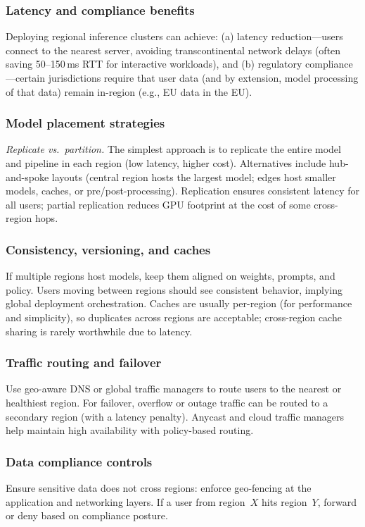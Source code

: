 \subsubsection{Latency and compliance benefits}
Deploying regional inference clusters can achieve: (a) latency reduction---users connect to the nearest server, avoiding transcontinental network delays (often saving 50--150\,ms RTT for interactive workloads), and (b) regulatory compliance---certain jurisdictions require that user data (and by extension, model processing of that data) remain in-region (e.g., EU data in the EU).

\subsubsection{Model placement strategies}
\emph{Replicate vs.\ partition.} The simplest approach is to replicate the entire model and pipeline in each region (low latency, higher cost). Alternatives include hub-and-spoke layouts (central region hosts the largest model; edges host smaller models, caches, or pre/post-processing). Replication ensures consistent latency for all users; partial replication reduces GPU footprint at the cost of some cross-region hops.

\subsubsection{Consistency, versioning, and caches}
If multiple regions host models, keep them aligned on weights, prompts, and policy. Users moving between regions should see consistent behavior, implying global deployment orchestration. Caches are usually per-region (for performance and simplicity), so duplicates across regions are acceptable; cross-region cache sharing is rarely worthwhile due to latency.

\subsubsection{Traffic routing and failover}
Use geo-aware DNS or global traffic managers to route users to the nearest or healthiest region. For failover, overflow or outage traffic can be routed to a secondary region (with a latency penalty). Anycast and cloud traffic managers help maintain high availability with policy-based routing.

\subsubsection{Data compliance controls}
Ensure sensitive data does not cross regions: enforce geo-fencing at the application and networking layers. If a user from region~$X$ hits region~$Y$, forward or deny based on compliance posture.

